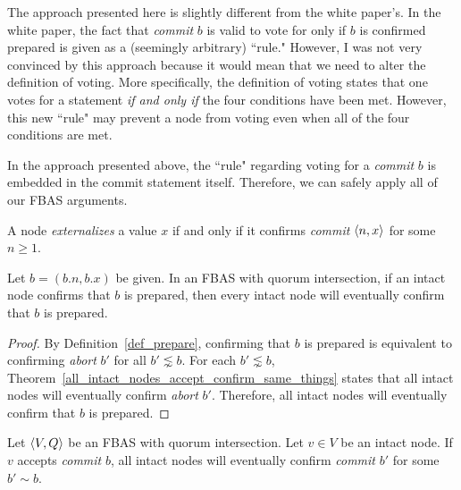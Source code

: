 \begin{rem}
    The approach presented here is slightly different from the white paper's.
    In the white paper, the fact that \textit{commit} $b$ is valid to vote for only if $b$ is confirmed prepared is given as a (seemingly arbitrary) ``rule."
    However, I was not very convinced by this approach because it would mean that we need to alter the definition of voting.
    More specifically, the definition of voting states that one votes for a statement \textit{if and only if} the four conditions have been met.  
    However, this new ``rule" may prevent a node from voting even when all of the four conditions are met.

    In the approach presented above, the ``rule" regarding voting for a \textit{commit} $b$ is embedded in the commit statement itself.
    Therefore, we can safely apply all of our FBAS arguments.
\end{rem}

\begin{defn}[Externalize]
    A node \textit{externalizes} a value $x$ if and only if it confirms \textit{commit} $\ev{n, x}$ for some $n \geq 1$.
\end{defn}

\begin{thm}
    Let $b = (b.n, b.x)$ be given.
    In an FBAS with quorum intersection, if an intact node confirms that $b$ is prepared, then every intact node will eventually confirm that $b$ is prepared.
\end{thm}

\begin{proof}
    By Definition~\ref{def_prepare}, confirming that $b$ is prepared is equivalent to confirming \textit{abort} $b'$ for all  $b' \lnsim  b$.
    For each $b' \lnsim b$, Theorem~\ref{all_intact_nodes_accept_confirm_same_things} states that all intact nodes will eventually confirm \textit{abort} $b'$.
    Therefore, all intact nodes will eventually confirm that $b$ is prepared.
\end{proof}

\begin{thm}
    Let $\ev{V, Q}$ be an FBAS with quorum intersection.
    Let $v \in V$ be an intact node.
    If $v$ accepts \textit{commit} $b$, all intact nodes will eventually confirm \textit{commit} $b'$ for some $b' \sim b$.
\end{thm}

